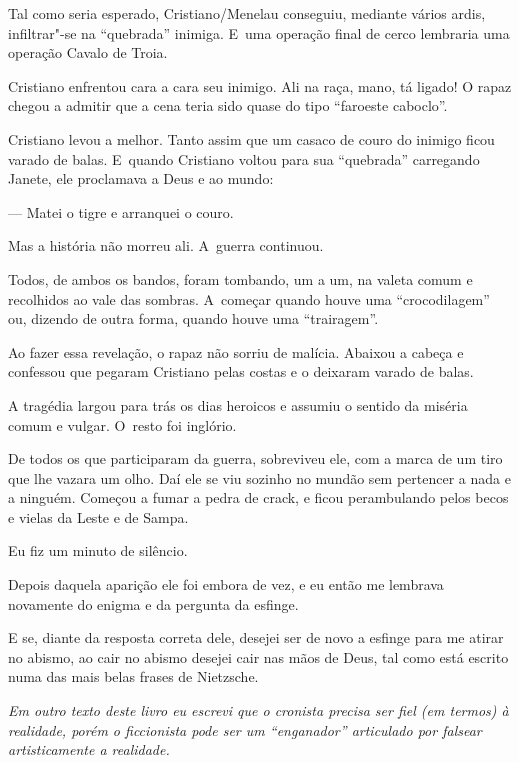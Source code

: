 Tal como seria esperado, Cristiano/Menelau conseguiu, mediante vários
ardis, infiltrar"-se na ``quebrada'' inimiga. E~uma operação final de
cerco lembraria uma operação Cavalo de Troia.

Cristiano enfrentou cara a cara seu inimigo. Ali na raça, mano, tá
ligado! O rapaz chegou a admitir que a cena teria sido quase do tipo
``faroeste caboclo''.

Cristiano levou a melhor. Tanto assim que um casaco de couro do inimigo
ficou varado de balas. E~quando Cristiano voltou para sua ``quebrada''
carregando Janete, ele proclamava a Deus e ao mundo:

— Matei o tigre e arranquei o couro.

Mas a história não morreu ali. A~guerra continuou.

Todos, de ambos os bandos, foram tombando, um a um, na valeta comum e
recolhidos ao vale das sombras. A~começar quando houve uma
``crocodilagem'' ou, dizendo de outra forma, quando houve uma
``trairagem''.

Ao fazer essa revelação, o rapaz não sorriu de malícia. Abaixou a cabeça
e confessou que pegaram Cristiano pelas costas e o deixaram varado de
balas.

A tragédia largou para trás os dias heroicos e assumiu o sentido da
miséria comum e vulgar. O~resto foi inglório.

De todos os que participaram da guerra, sobreviveu ele, com a marca de um
tiro que lhe vazara um olho. Daí ele se viu sozinho no mundão sem
pertencer a nada e a ninguém. Começou a fumar a pedra de crack, e ficou
perambulando pelos becos e vielas da Leste e de Sampa.

Eu fiz um minuto de silêncio.

\asterisc{}

Depois daquela aparição ele foi embora de vez, e eu então me lembrava
novamente do enigma e da pergunta da esfinge.

E se, diante da resposta correta dele, desejei ser de novo a esfinge
para me atirar no abismo, ao cair no abismo desejei cair nas mãos de
Deus, tal como está escrito numa das mais belas frases de Nietzsche.~

\begin{center}\asterisc{}\end{center}
\begingroup\small


\emph{Em outro texto deste livro eu escrevi que o cronista precisa ser
fiel (em termos) à realidade, porém o ficcionista pode ser um
``enganador'' articulado por falsear artisticamente a realidade.}~

